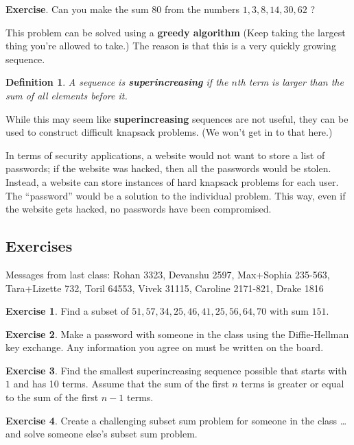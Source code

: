 \documentclass[11pt]{article}
\newtheorem{dfn}[thm]{Definition}
\theoremstyle{definition}
\newtheorem{exercise}{Exercise}
\numberwithin{thm}{section}
\begin{document}
\textbf{Exercise}. Can you make the sum $80$ from the numbers $1, 3, 8, 14, 30, 62$ ?

This problem can be solved using a \textbf{greedy algorithm} (Keep taking the largest thing you're allowed to take.) The reason is that this is a very quickly growing sequence.

\begin{dfn} A sequence is \textbf{superincreasing} if the $n$th term is larger than the sum of all elements before it.
\end{dfn}

While this may seem like \textbf{superincreasing} sequences are not useful, they can be used to construct difficult knapsack problems. (We won't get in to that here.)

In terms of security applications, a website would not want to store a list of passwords; if the website was hacked, then all the passwords would be stolen. Instead, a website can store instances of hard knapsack problems for each user. The ``password'' would be a solution to the individual problem. This way, even if the website gets hacked, no passwords have been compromised. 

\subsection{Exercises}

Messages from last class: Rohan 3323, Devanshu 2597, Max+Sophia 235-563, Tara+Lizette 732, Toril 64553, Vivek 31115, Caroline 2171-821, Drake 1816 

\begin{exercise} Find a subset of $51, 57, 34, 25, 46, 41, 25, 56, 64, 70$ with sum $151$.
\end{exercise}

\begin{exercise} Make a password with someone in the class using the Diffie-Hellman key exchange. Any information you agree on must be written on the board.
\end{exercise}

\begin{exercise} Find the smallest superincreasing sequence possible that starts with $1$ and has 10 terms. Assume that the sum of the first $n$ terms is greater or equal to the sum of the first $n-1$ terms.  
\end{exercise}

\begin{exercise} Create a challenging subset sum problem for someone in the class \ldots and solve someone else's subset sum problem.
\end{exercise}
\end{document}
